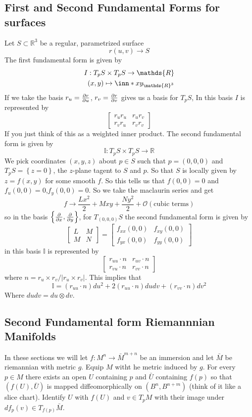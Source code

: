 \documentclass[a4paper]{article}
\begin{document}
\subsection*{First and Second Fundamental Forms for surfaces}%
Let $S \subset \mathds{R}^3$ be a regular, parametrized surface
\[
  r(u,v) \rightarrow S
\]
The first fundamental form is given by
\[
  \begin{aligned}
    I&: T_pS \times T_pS \rightarrow \mathds{R}\\
     &(x,y) \mapsto \inn*{x}{y}_{\mathds{R}^3}
  \end{aligned}
\]
If we take the basis $r_u = \pdv{r}{u}$, $r_v = \pdv{r}{v}$ gives us a basis for $T_pS$, In this basis $I$ is represented by
\[
  \begin{bmatrix}
    r_u r_u & r_u r_v \\
    r_v r_u & r_v r_v
  \end{bmatrix}
\]
If you just think of this as a weighted inner product. The second fundamental form is given by
\[
  \mathds{I}: T_pS \times T_pS \rightarrow \mathds{R}
\]
We pick coordinates $(x,y,z)$ about $p \in S$ such that $p = (0,0,0)$ and $T_pS = \left\{ z = 0 \right\}$, the $z$-plane tagent to $S$ and $p$. So that $S$ is locally given by $z = f(x,y)$ for some smooth $f$. So this tells us that $f(0,0) = 0$ and $f_u(0,0) = 0$,$f_y(0,0) = 0$. So we take the maclaurin series and get
\[
  f \rightarrow \frac{Lx^2}{2} + Mxy + \frac{Ny^2}{2} + \mathcal{O}(\text{cubic terms})
\]
so in the basis $\left\{ \pdv{x}, \pdv{y} \right\}$, for $T_{(0,0,0)}S$ the second fundamental form is given by
\[
  \begin{bmatrix}
    L & M \\
    M & N
  \end{bmatrix}
  = 
  \begin{bmatrix}
    f_{xx}(0,0) & f_{xy}(0,0) \\
    f_{yx}(0,0) & f_{yy}(0,0)
  \end{bmatrix}
\]
in this basis $\mathds{I}$ is represented by
\[
  \begin{bmatrix}
    r_{uu} \cdot n & r_{uv} \cdot n \\
    r_{vu} \cdot n & r_{vv} \cdot n
  \end{bmatrix}
\]
where $n = r_u \times r_v / |r_u \times r_v|$.  This implies that 
\[
  \mathds{I} = (r_{uu} \cdot n) du^2 + 2(r_{uu} \cdot n) dudv + (r_{vv} \cdot n) dv^2
\]
Where $dudv = du \otimes dv$. 

\subsection*{Second Fundamental form Riemannnian Manifolds}%
In these sections we will let $f: M^n \rightarrow \bar{M}^{m+n}$ be an immersion and let $\bar{M}$ be riemannian with metric $g$. Equip $M$ witht he metric induced by $g$. For every $p \in M$ there exists an open $U$ containing $p$ and $\bar{U}$ containing $f(p)$ so that $(f(U), \bar{U})$ is mapped diffeomorphically on $(B^n, B^{n+m})$ (think of it like a slice chart). Identify $U$ with $f(U)$ and $v \in T_pM$ with their image under $df_p(v) \in T_{f(p)}\bar{M}$. 
\end{document}

